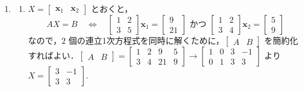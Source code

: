 \documentclass[11pt, uplatex, dvipdfmx]{jsarticle}
\begin{document}
\begin{enumerate}
  \setlength{\itemsep}{1zh}
  
\item
  \begin{enumerate}[(1)]
    \setlength{\itemsep}{1ex}

  \item $X=\left[
      \begin{array}{cc}
        \bm{x}_1 & \bm{x}_2
      \end{array}
    \right]$ とおくと，
    \[
      AX = B \quad \Longleftrightarrow \quad \left[
        \begin{array}{cc}
          1 & 2\\
          3 & 5
        \end{array}
      \right] \bm{x}_1 = \left[
        \begin{array}{r}
          9\\
          21
        \end{array}
      \right] \text{ かつ } \left[
        \begin{array}{cc}
          1 & 2\\
          3 & 4
        \end{array}
      \right] \bm{x}_2 = \left[
        \begin{array}{r}
          5\\
          9
        \end{array}
      \right]
    \]
    なので，$2$ 個の連立1次方程式を同時に解くために，$\left[
      \begin{array}{cc}
        A & B
      \end{array}
    \right]$ を簡約化すればよい．$\left[
      \begin{array}{cc}
        A & B
      \end{array}
    \right] = \left[
      \begin{array}{rrrr}
        1 & 2 & 9 & 5\\
        3 & 4 & 21 & 9
      \end{array}
    \right] \to \left[
      \begin{array}{rrrr}
        1 & 0 & 3 & -1\\
        0 & 1 & 3 & 3
      \end{array}
    \right]$ より $X=\left[
      \begin{array}{rr}
        3 & -1\\
        3 & 3
      \end{array}
    \right]$.


\end{enumerate}
\end{enumerate}
\end{document}
